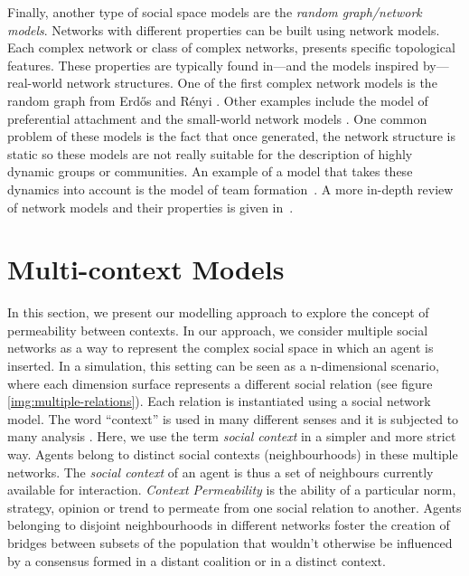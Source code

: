 \documentclass[preprint,number]{elsarticle}
\begin{document}
	Finally, another type of social space models are the \textit{random graph/network models}. Networks with different properties can be built using network models. Each complex network or class of complex networks, presents specific topological features. These properties are typically found in---and the models inspired by---real-world network structures. One of the first complex network models is the random graph from Erd\H{o}s and Rényi \cite{Erdos1959}. Other examples include the model of preferential attachment \cite{Barabasi1999} and the small-world network models \cite{Watts1998}. One common problem of these models is the fact that once generated, the network structure is static so these models are not really suitable for the description of highly dynamic groups or communities. An example of a model that takes these dynamics into account is the model of team formation~\cite{Gaston2005}. A more in-depth review of network models and their properties is given in~\cite{Nunes2012}.
	
	
	\section{Multi-context Models}
	\label{sec:multi-context-models} 
\noindent In this section, we present our modelling approach to explore the concept of permeability between contexts. In our approach, we consider multiple social networks as a way to represent the complex social space in which an agent is inserted. In a simulation, this setting can be seen as a n-dimensional scenario, where each dimension surface represents a different social relation (see figure \ref{img:multiple-relations}). Each relation is instantiated using a social network model. The word ``context'' is used in many different senses and it is subjected to many analysis \cite{Hayes1997}. Here, we use the term \textit{social context} in a simpler and more strict way. Agents belong to distinct social contexts (neighbourhoods) in these multiple networks. The \textit{social context} of an agent is thus a set of neighbours currently available for interaction. \textit{Context Permeability} is the ability of a particular norm, strategy, opinion or trend to permeate from one social relation to another. Agents belonging to disjoint neighbourhoods in different networks foster the creation of bridges between subsets of the population that wouldn't otherwise be influenced by a consensus formed in a distant coalition or in a distinct context. 
	
\end{document}
